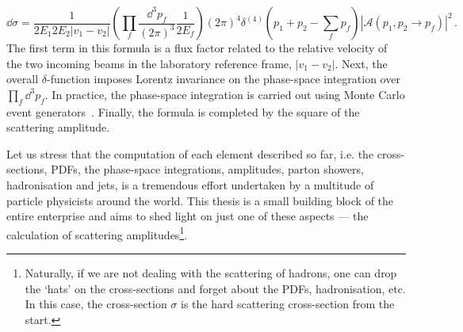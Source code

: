 \documentclass[main.tex]{subfiles}
\begin{document}
\begin{equation} \label{eq:crosssecampl}
    \dd \hat{\sigma} = \frac{1}{2E_1 2E_2 |v_1-v_2|} \left(\prod_f \frac{\dd^3 p_f}{(2\pi)^3} \frac{1}{2E_f} \right) (2\pi)^4 \delta^{(4)}\left(p_1+p_2 - \sum_f p_f\right)|\mathcal{A}(p_1,p_2 \rightarrow p_f)|^2\,.
\end{equation}
The first term in this formula is a flux factor related to the relative velocity of the two incoming beams in the laboratory reference frame, $|v_1-v_2|$. Next, the overall $\delta$-function imposes Lorentz invariance on the phase-space integration over $\prod_f \dd^3 p_f$. In practice, the phase-space integration is carried out using Monte Carlo event generators~\cite{Reuschle:2014fya, Campbell:2022qmc}. Finally, the formula is completed by the square of the scattering amplitude.

Let us stress that the computation of each element described so far, i.e. the cross-sections, PDFs, the phase-space integrations, amplitudes, parton showers, hadronisation and jets, is a tremendous effort undertaken by a multitude of particle physicists around the world. This thesis is a small building block of the entire enterprise and aims to shed light on just one of these aspects --- the calculation of scattering amplitudes\footnote{Naturally, if we are not dealing with the scattering of hadrons, one can drop the `hats' on the cross-sections and forget about the PDFs, hadronisation, etc. In this case, the cross-section $\sigma$ is the hard scattering cross-section from the start.}.
\end{document}
